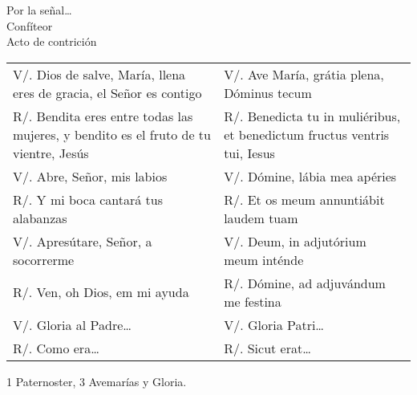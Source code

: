 \documentclass[./devocionario.tex]{subfiles}
\begin{document}
    \begin{center}
        Por la señal{\ldots}\\
        Confíteor\\
        Acto de contrición
    \end{center}

    \begin{longtable} { p{} p{} }
        V/. Dios de salve, María, llena eres de gracia, el Señor es contigo & V/. Ave María, grátia plena, Dóminus tecum\\
        R/. Bendita eres entre todas las mujeres, y bendito es el fruto de tu vientre, Jesús & 
        R/. Benedicta tu in muliéribus, et benedictum fructus ventris tui, Iesus\\
        V/. Abre, Señor, mis labios & V/. Dómine, lábia mea apéries\\
        R/. Y mi boca cantará tus alabanzas & R/. Et os meum annuntiábit laudem tuam\\
        V/. Apresútare, Señor, a socorrerme & V/. Deum, in adjutórium meum inténde\\
        R/. Ven, oh Dios, em mi ayuda & R/. Dómine, ad adjuvándum me festina\\ 
        V/. Gloria al Padre{\ldots} & V/. Gloria Patri{\ldots}\\
        R/. Como era{\ldots} & R/. Sicut erat{\ldots}\\
    \end{longtable}

    

    \begin{center}
        1 Paternoster, 3 Avemarías y Gloria.
    \end{center}
\end{document}
